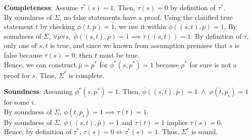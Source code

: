 \documentclass[unicode,11pt,a4paper,oneside,numbers=endperiod,openany]{scrartcl}
\begin{document}
\noindent \textbf{Completeness}:
\noindent Assume  \( \tau^*(s) = 1 \). 
Then, \( \tau(s) = 0 \) by definition of \( \tau^* \). \\
By soundness of \( \Sigma \), no false statements have a proof.
Using the clarified true statement \( t \) by checking \( \phi(t, p) = 1 \),
we use it within \( \overline{\phi}((s, t), \overline{p}) = 1 \),
By soundness of \( \overline{\Sigma} \), \( \forall p \forall s, \; 
    \overline{\phi}((s, t), \overline{p}) = 1 \implies \overline{\tau}((s, t)) = 1 \).
By definition of \( \overline{\tau} \), only one of \( s, t \) is true,
and since we known from assumption premises that \( s \) is false because \( \tau(s) = 0 \),
then \( t \) must be true. \\
Hence, we can construct \( \overline{p} = p^* \) for \( \phi^*(s, p^*) = 1 \) 
because \( p^* \) for sure is not a proof for \( s \). 
Thus, \( \Sigma^* \) is complete. \newline

\noindent \textbf{Soundness}:
\noindent Assuming \( \phi^*(s, p^*) = 1 \). 
Then, \( \overline{\phi}((s, t), \overline{p}) = 1 \; \land \; \phi(t, \overline{p_i}) = 1 \) for 
some \( i \). \\
By soundness of \( \Sigma \), \(\phi(t, \overline{p_i}) = 1 \implies \tau(t) = 1 \). \\
By soundness of \( \overline{\Sigma} \), \( \overline{\phi}((s, t), \overline{p}) = 1 \) 
and \( \tau(t) = 1 \) implies \( \tau(s) = 0 \). \\
Hence, by definition of \( \tau^* \), \( \tau(s) = 0 \iff \tau^*(s) = 1 \).
Thus, \( \Sigma^* \) is sound.
\end{document}
